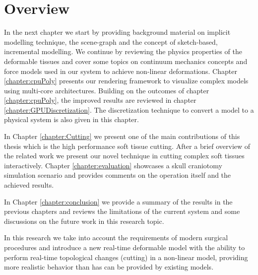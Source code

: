 \section{Overview}
In the next chapter we start by providing background material on implicit modelling technique, the \blob scene-graph and the concept of sketch-based, incremental modelling.
We continue by reviewing the physics properties of the deformable tissues and cover some topics on continuum mechanics concepts and force models used in
our system to achieve non-linear deformations. Chapter \ref{chapter:cpuPoly} presents our rendering framework to visualize complex \blob models using multi-core 
architectures. Building on the outcomes of chapter \ref{chapter:cpuPoly}, the improved results are reviewed in chapter \ref{chapter:GPUDiscretization}. 
The discretization technique to convert a \blob model to a physical system is also given in this chapter. 

In Chapter \ref{chapter:Cutting} we present one of the main contributions of this thesis which is the high performance soft tissue cutting. After a brief overview of the 
related work we present our novel technique in cutting complex soft tissues interactively. Chapter \ref{chapter:evaluation} showcases a skull craniotomy simulation 
scenario and provides comments on the operation itself and the achieved results.

In Chapter \ref{chapter:conclusion} we provide a summary of the results in the previous chapters and reviews the limitations of the current system
and some discussions on the future work in this research topic.


In this research we take into account the requirements of modern surgical 
procedures and introduce a new real-time deformable model with the ability to 
perform real-time topological changes (cutting) in a non-linear model, providing 
more realistic behavior than has can be provided by existing models. 














